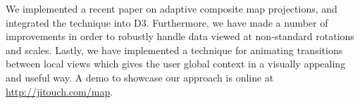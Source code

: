 We implemented a recent paper on adaptive composite map projections, and
  integrated the technique into D3.
Furthermore, we have made a number of improvements in order to robustly
  handle data viewed at non-standard rotations and scales.
Lastly, we have implemented a technique for animating transitions between
  local views which gives the user global context in a visually appealing and
  useful way.
A demo to showcase our approach is online at \url{http://jitouch.com/map}.
